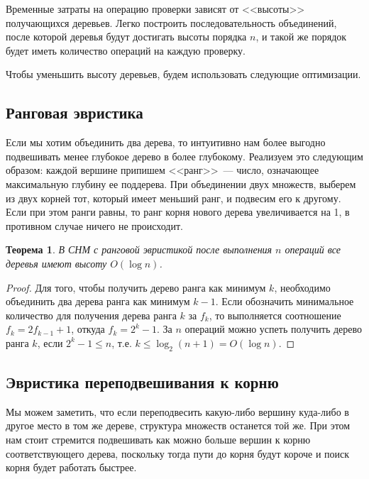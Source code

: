 \documentclass[12pt]{article}
\newtheorem*{theorem*}{Теорема}
\renewcommand{\leq}{\leqslant}
\begin{document}
Временные затраты на операцию проверки зависят от <<высоты>> получающихся деревьев. Легко построить последовательность объединений, после которой деревья будут достигать высоты порядка $n$, и такой же порядок будет иметь количество операций на каждую проверку.

Чтобы уменьшить высоту деревьев, будем использовать следующие оптимизации.

\subsection{Ранговая эвристика}

Если мы хотим объединить два дерева, то интуитивно нам более выгодно подвешивать менее глубокое дерево в более глубокому. Реализуем это следующим образом: каждой вершине припишем <<ранг>>~--- число, означающее максимальную глубину ее поддерева. При объединении двух множеств, выберем из двух корней тот, который имеет меньший ранг, и подвесим его к другому. Если при этом ранги равны, то ранг корня нового дерева увеличивается на 1, в 
противном случае ничего не происходит.

\begin{theorem*}

В СНМ с ранговой эвристикой после выполнения $n$ операций все деревья имеют высоту $O(\log n)$.

\end{theorem*}

\begin{proof}

Для того, чтобы получить дерево ранга как минимум $k$, необходимо объединить два дерева ранга как минимум $k - 1$. Если обозначить минимальное количество для получения дерева ранга $k$ за $f_k$, то выполняется соотношение $f_k = 2f_{k-1} + 1$, откуда $f_k = 2^k - 1$. За $n$ операций можно успеть получить дерево ранга $k$, если $2^k - 1 \leq n$, т.е. $k \leq \log_2(n + 1) = O(\log n)$.

\end{proof}

\subsection{Эвристика переподвешивания к корню}

Мы можем заметить, что если переподвесить какую-либо вершину куда-либо в другое место в том же дереве, структура множеств останется той же. При этом нам стоит стремится подвешивать как можно больше вершин к корню соответствующего дерева, поскольку тогда пути до корня будут короче и поиск корня будет работать быстрее.
\end{document}
